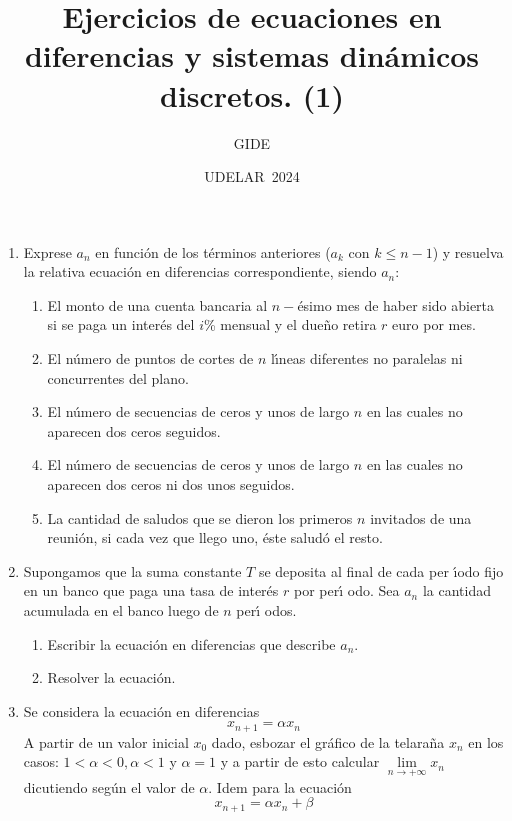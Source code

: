 \documentclass{article}
\begin{document}
\title{Ejercicios de ecuaciones en diferencias y sistemas din\'{a}micos
discretos. (1)}
\author{GIDE}
\date{UDELAR\ 2024}
\maketitle

\begin{enumerate}
\item Exprese $a_{n}$ en funci\'{o}n de los t\'{e}rminos anteriores ($a_{k}$
con $k\leq n-1$) y resuelva la relativa ecuaci\'{o}n en diferencias
correspondiente, siendo $a_{n}$:

\begin{enumerate}
\item El monto de una cuenta bancaria al $n-$\'{e}simo mes de haber sido
abierta si se paga un inter\'{e}s del $i$\% mensual y el due\~{n}o retira $r$
euro por mes.

\item El n\'{u}mero de puntos de cortes de $n$ l\'{\i}neas diferentes no
paralelas ni concurrentes del plano.

\item El n\'{u}mero de secuencias de ceros y unos de largo $n$ en las cuales
no aparecen dos ceros seguidos.

\item El n\'{u}mero de secuencias de ceros y unos de largo $n$ en las cuales
no aparecen dos ceros ni dos unos seguidos.

\item La cantidad de saludos que se dieron los primeros $n$ invitados de una
reuni\'{o}n, si cada vez que llego uno, \'{e}ste salud\'{o} el resto.
\end{enumerate}

\item Supongamos que la suma constante $T$ se deposita al final de cada per%
\'{\i}odo fijo en un banco que paga una tasa de inter\'{e}s $r$ por per\'{\i}%
odo. Sea $a_{n}$ la cantidad acumulada en el banco luego de $n$ per\'{\i}%
odos.

\begin{enumerate}
\item Escribir la ecuaci\'{o}n en diferencias que describe $a_{n}$.

\item Resolver la ecuaci\'{o}n.
\end{enumerate}

\item Se considera la ecuaci\'{o}n en diferencias 
\begin{equation*}
x_{n+1}=\alpha x_{n}
\end{equation*}%
A partir de un valor inicial $x_{0}$ dado, esbozar el gr\'{a}fico de la
telara\~{n}a $x_{n}$ en los casos: $1<\alpha <0,\alpha <1$ y $\alpha =1$ y a
partir de esto calcular $\underset{n\rightarrow +\infty }{\lim }x_{n}$
dicutiendo seg\'{u}n el valor de $\alpha $. Idem para la ecuaci\'{o}n%
\begin{equation*}
x_{n+1}=\alpha x_{n}+\beta
\end{equation*}


\end{enumerate}
\end{document}
